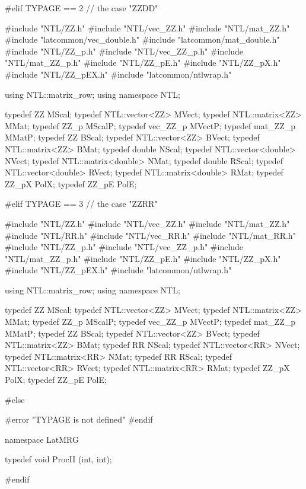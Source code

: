 #elif TYPAGE == 2
// the case  "ZZDD"

#include "NTL/ZZ.h"
#include "NTL/vec_ZZ.h"
#include "NTL/mat_ZZ.h"
#include "latcommon/vec_double.h"
#include "latcommon/mat_double.h"
#include "NTL/ZZ_p.h"
#include "NTL/vec_ZZ_p.h"
#include "NTL/mat_ZZ_p.h"
#include "NTL/ZZ_pE.h"
#include "NTL/ZZ_pX.h"
#include "NTL/ZZ_pEX.h"
#include "latcommon/ntlwrap.h"

using NTL::matrix_row;
using namespace NTL;


typedef ZZ              MScal;
typedef NTL::vector<ZZ> MVect;
typedef NTL::matrix<ZZ> MMat;
   typedef ZZ_p     MScalP;
   typedef vec_ZZ_p MVectP;
   typedef mat_ZZ_p MMatP;
typedef ZZ              BScal;
typedef NTL::vector<ZZ> BVect;
typedef NTL::matrix<ZZ> BMat;
typedef double              NScal;
typedef NTL::vector<double> NVect;
typedef NTL::matrix<double> NMat;
typedef double              RScal;
typedef NTL::vector<double> RVect;
typedef NTL::matrix<double> RMat;
   typedef ZZ_pX    PolX;
   typedef ZZ_pE    PolE; 
\endcode
\newpage
\code


#elif TYPAGE == 3
// the case  "ZZRR"

#include "NTL/ZZ.h"
#include "NTL/vec_ZZ.h"
#include "NTL/mat_ZZ.h"
#include "NTL/RR.h"
#include "NTL/vec_RR.h"
#include "NTL/mat_RR.h"
#include "NTL/ZZ_p.h"
#include "NTL/vec_ZZ_p.h"
#include "NTL/mat_ZZ_p.h"
#include "NTL/ZZ_pE.h"
#include "NTL/ZZ_pX.h"
#include "NTL/ZZ_pEX.h"
#include "latcommon/ntlwrap.h"

using NTL::matrix_row;
using namespace NTL;


typedef ZZ              MScal;
typedef NTL::vector<ZZ> MVect;
typedef NTL::matrix<ZZ> MMat;
   typedef ZZ_p     MScalP;
   typedef vec_ZZ_p MVectP;
   typedef mat_ZZ_p MMatP;
typedef ZZ              BScal;
typedef NTL::vector<ZZ> BVect;
typedef NTL::matrix<ZZ> BMat;
typedef RR              NScal;
typedef NTL::vector<RR> NVect;
typedef NTL::matrix<RR> NMat;
typedef RR              RScal;
typedef NTL::vector<RR> RVect;
typedef NTL::matrix<RR> RMat;
   typedef ZZ_pX    PolX;
   typedef ZZ_pE    PolE;
\endcode
\newpage
\code


#else

#error "TYPAGE is not defined"
#endif



namespace LatMRG {

   typedef void ProcII (int, int);
}
\hide
#endif
\endhide
\endcode
